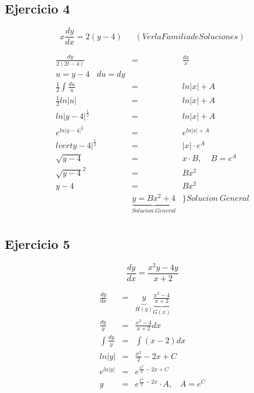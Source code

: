 \documentclass{article}
\begin{document}
\subsection{Ejercicio 4}

\begin{equation}
x \frac{dy}{dx} = 2 \left(y-4 \right) \ \ \ \ \ \ \ (Ver la Familia de Soluciones)
\end{equation}

\begin{eqnarray}
\nonumber \frac{dy}{2\left(2t-4 \right)} &=& \frac{dx}{x}  \\
\nonumber u = y-4 \ \ \ \ du = dy  & & \\
\nonumber \frac{1}{2} \int \frac{du}{u} &=& ln \lvert x \rvert + A\\
\nonumber \frac{1}{2} ln \lvert u \rvert &=& ln \lvert x \rvert + A \\
\nonumber ln{\lvert y-4 \rvert }^{\frac{1}{2}} &=& ln \lvert x \rvert +A \\
\nonumber e^{ln{\lvert y-4 \rvert }^{\frac{1}{2}}} &=& e^{ ln \lvert x \rvert + A } \\
\nonumber {lvert y-4 \rvert}^{\frac{1}{2}}  &=& \lvert x \rvert \cdot e^A \\
\nonumber \sqrt{y-4} &=& x \cdot B, \ \ \ \ \ B =  e^A  \\
\nonumber {\sqrt{y-4}}^2 &=& Bx^2 \\
\nonumber y-4 &=& Bx^2 \\ 
\nonumber  & \underbrace{y = Bx^2 + 4}_{Solucion \ General} & \rbrace Solucion \ General \\
\end{eqnarray}

\subsection{Ejercicio 5}

\begin{equation}
\frac{dy}{dx} = \frac{x^2 y -4y}{x+2}
\end{equation}

\begin{eqnarray}
\nonumber \frac{dy}{dx} &=& \underbrace{y}_{H\left( y \right)} \underbrace{\frac{x^2 -4}{x+2}}_{G\left( x \right)} \\
\nonumber \frac{dy}{y} &=& \frac{x^2 -4}{x+2} dx \\
\nonumber \int \frac{dy}{y} &=& \int \left( x-2 \right)dx  \\
\nonumber ln \lvert y \rvert &=& \frac{x^2}{2} - 2x + C \\
\nonumber e^{ln \lvert y \rvert} &=& e^{\frac{x^2}{2} - 2x + C} \\
\nonumber y &=& e^{\frac{x^2}{2} - 2x } \cdot A , \ \ \ \ A = e^C \\
\end{eqnarray}
\end{document}
